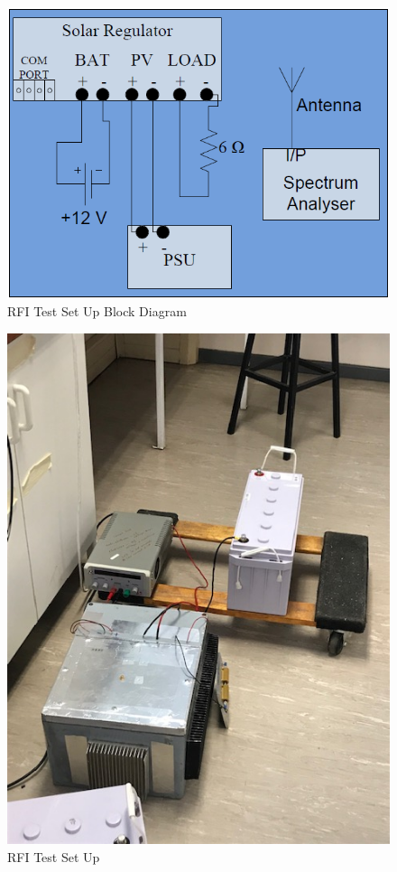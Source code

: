\documentclass[12pt,a4paper]{report}
\begin{document}
\begin{figure}[h!]
	\begin{center}
		\includegraphics[width=0.7\linewidth]{Figures/RFI.PNG}
		\caption{RFI Test Set Up Block Diagram}
		\label{Fig:BlockDiagram}
	\end{center}
\end{figure}

\begin{figure}[h!]
	\begin{center}
		\includegraphics[width=0.6\linewidth, angle=-90]{Figures/IMG_3784.jpg}
		\caption{RFI Test Set Up}
		\label{Fig:setup}
	\end{center}
\end{figure}

\newpage
\end{document}

